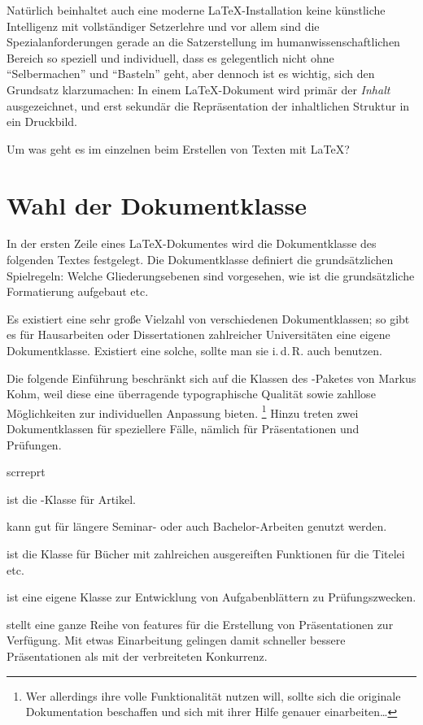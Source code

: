 Natürlich beinhaltet auch eine moderne \LaTeX -Installation keine künstliche Intelligenz mit 
vollständiger Setzerlehre und vor allem sind die Spezialanforderungen gerade an die Satzerstellung im
humanwissenschaftlichen Bereich so speziell und individuell, dass es gelegentlich nicht ohne 
\enquote{Selbermachen} und \enquote{Basteln} geht, aber dennoch ist es wichtig, sich den Grundsatz
klarzumachen: In einem \LaTeX -Dokument wird primär der \emph{Inhalt} ausgezeichnet, und erst sekundär
die Repräsentation der inhaltlichen Struktur in ein Druckbild.

Um was geht es im einzelnen beim Erstellen von Texten mit \LaTeX ? 


\section{Wahl der Dokumentklasse}

In der ersten Zeile eines \LaTeX -Dokumentes wird die Dokumentklasse des folgenden Textes 
festgelegt. Die Dokumentklasse definiert die grundsätzlichen Spielregeln:
Welche Gliederungsebenen sind vorgesehen, wie ist die grundsätzliche Formatierung aufgebaut etc.

Es existiert eine sehr große Vielzahl von verschiedenen Dokumentklassen;
so gibt es für Hausarbeiten oder Dissertationen zahlreicher Universitäten eine eigene
Dokumentklasse. Existiert eine solche, sollte man sie i.\,d.\,R. auch benutzen.

Die folgende Einführung beschränkt sich auf die Klassen des \KOMAScript-Paketes von
Markus Kohm, weil diese eine überragende typographische Qualität sowie zahllose Möglichkeiten
zur individuellen Anpassung bieten.%
\footnote{Wer allerdings ihre volle Funktionalität nutzen will, sollte sich die originale 
Dokumentation beschaffen und sich mit ihrer Hilfe genauer einarbeiten\dots}
Hinzu treten zwei Dokumentklassen für speziellere Fälle, nämlich für Präsentationen und 
Prüfungen.

\begin{labeling}{scrreprt}
 \item[scrartcl] ist die \KOMAScript-Klasse für Artikel.
 \item[scrreprt] kann gut für längere Seminar- oder auch Bachelor-Arbeiten genutzt werden.
 \item[scrbook] ist die Klasse für Bücher mit zahlreichen ausgereiften Funktionen für
  die Titelei etc.
 \item[exam] ist eine eigene Klasse zur Entwicklung von Aufgabenblättern zu Prüfungszwecken.
 \item[beamer] stellt eine ganze Reihe von features für die Erstellung von Präsentationen
  zur Verfügung. Mit etwas Einarbeitung gelingen damit schneller bessere Präsentationen als 
  mit der verbreiteten Konkurrenz.
\end{labeling}


